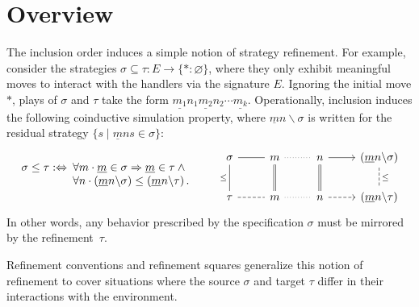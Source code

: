 \section{Overview}
\label{sec:rc:overview}
The inclusion order induces a simple notion of strategy refinement.
For example,
consider the strategies
$\sigma \subseteq \tau : E \rightarrow \{ {*} : \varnothing \}$,
where they only exhibit meaningful moves
to interact with the handlers
via the signature $E$.
Ignoring the initial move $*$,
plays of $\sigma$ and $\tau$ take the form
$
\underline{m_1} n_1 \underline{m_2} n_2 \cdots \underline{m_k}
$.
Operationally,
inclusion induces the following coinductive simulation property,
where $\underline{m}n \backslash \sigma$ is written
for the residual strategy $\{ s \mid \underline{m}ns \in \sigma \}$:
\begin{equation} \label{eqn:sim}
  \begin{array}{r@{\:}l}
    \sigma \le \tau :\Leftrightarrow {} &
    \forall m \cdot
    \underline{m} \in \sigma \Rightarrow
    \underline{m} \in \tau \wedge {} \\ &
    \forall n \cdot
    (\underline{m} n \backslash \sigma) \le
    (\underline{m} n \backslash \tau)
    \,.
  \end{array}
  \qquad
  \begin{tikzcd}
    \sigma \ar[r,dash] \ar[d, dash, "\le"'] &
    m \ar[r,dotted,dash] \ar[d,equal] &
    n \ar[r] \ar[d,equal] &
    (\underline{m} n \backslash \sigma) \ar[d, dash, dashed, "\le"]
    \\
    \tau \ar[r,dash, dashed] &
    m \ar[r,dotted,dash] &
    n \ar[r,dashed] &
    (\underline{m} n \backslash \tau)
  \end{tikzcd}
\end{equation}
In other words,
any behavior prescribed by the specification $\sigma$
must be mirrored by the refinement~$\tau$.

Refinement conventions and refinement squares
generalize this notion of refinement
to cover situations where the source $\sigma$ and target $\tau$
differ in their interactions with the environment.

